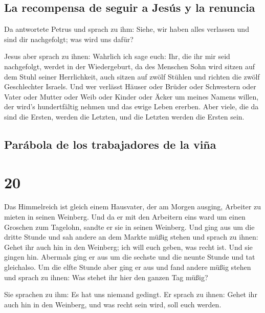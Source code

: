 \hypertarget{la-recompensa-de-seguir-a-jesuxfas-y-la-renuncia}{%
\subsection{La recompensa de seguir a Jesús y la
renuncia}\label{la-recompensa-de-seguir-a-jesuxfas-y-la-renuncia}}

 Da antwortete Petrus und sprach zu ihm: Siehe, wir haben
alles verlassen und sind dir nachgefolgt; was wird uns dafür?

 Jesus aber sprach zu ihnen: Wahrlich ich sage euch: Ihr,
die ihr mir seid nachgefolgt, werdet in der Wiedergeburt, da des
Menschen Sohn wird sitzen auf dem Stuhl seiner Herrlichkeit, auch sitzen
auf zwölf Stühlen und richten die zwölf Geschlechter Israels.
 Und wer verlässt Häuser oder Brüder oder Schwestern oder
Vater oder Mutter oder Weib oder Kinder oder Äcker um meines Namens
willen, der wird's hundertfältig nehmen und das ewige Leben ererben.
 Aber viele, die da sind die Ersten, werden die Letzten,
und die Letzten werden die Ersten sein.

\hypertarget{paruxe1bola-de-los-trabajadores-de-la-viuxf1a}{%
\subsection{Parábola de los trabajadores de la
viña}\label{paruxe1bola-de-los-trabajadores-de-la-viuxf1a}}

\hypertarget{section-19}{%
\section{20}\label{section-19}}

 Das Himmelreich ist gleich einem Hausvater, der am Morgen
ausging, Arbeiter zu mieten in seinen Weinberg.  Und da er
mit den Arbeitern eins ward um einen Groschen zum Tagelohn, sandte er
sie in seinen Weinberg.  Und ging aus um die dritte Stunde
und sah andere an dem Markte müßig stehen  und sprach zu
ihnen: Gehet ihr auch hin in den Weinberg; ich will euch geben, was
recht ist.  Und sie gingen hin. Abermals ging er aus um
die sechste und die neunte Stunde und tat gleichalso.  Um
die elfte Stunde aber ging er aus und fand andere müßig stehen und
sprach zu ihnen: Was stehet ihr hier den ganzen Tag müßig?

 Sie sprachen zu ihm: Es hat uns niemand gedingt. Er
sprach zu ihnen: Gehet ihr auch hin in den Weinberg, und was recht sein
wird, soll euch werden.

